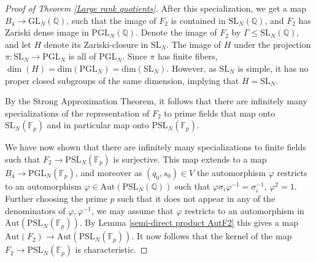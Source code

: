 \documentclass[10pt,a4paper]{amsart}
\begin{document}
\begin{proof}[Proof of Theorem \ref{Large rank quotients}]
After this specialization, we get a map $B_4 \to \mathrm{GL}_N(\mathbb{Q})$, such that the image of $F_2$ is contained in $\mathrm{SL}_N(\mathbb{Q})$, and $F_2$ has Zariski dense image in $\mathrm{PGL}_N(\mathbb{Q})$. Denote the image of $F_2$ by $\Gamma \leq \mathrm{SL}_N(\mathbb{Q}),$ and let $H$ denote its Zariski-closure in $\mathrm{SL}_N.$ The image of $H$ under the projection $\pi:\mathrm{SL}_N \to \mathrm{PGL}_N$ is all of $\mathrm{PGL}_N$. Since $\pi$ has finite fibers, $\dim(H)=\mathrm{dim}(\mathrm{PGL}_N)=\mathrm{dim}(\mathrm{SL}_N)$. However, as $\mathrm{SL}_N$ is simple, it has no proper closed subgroups of the same dimension, implying that $H = \mathrm{SL}_N$.

By the Strong Approximation Theorem, it follows that there are infinitely many specializations of the representation of $F_2$ to prime fields that map onto $\mathrm{SL}_N(\mathbb{F}_p)$ and in particular map onto $\mathrm{PSL}_N(\mathbb{F}_p).$

We have now shown that there are infinitely many specializations to finite fields such that $F_2 \to \mathrm{PSL}_N(\mathbb{F}_p)$ is surjective. This map extends to a map $B_4 \to \mathrm{PGL}_N(\mathbb{F}_p)$, and moreover as $(q_0, s_0) \in V$ the automorphism $\varphi$ restricts to an automorphism $\varphi \in \mathrm{Aut}(\mathrm{PSL}_N(\mathbb{Q}))$ such that $\varphi\sigma_i\varphi^{-1} = \sigma_i^{-1}$, $\varphi^2 = 1$. Further choosing the prime $p$ such that it does not appear in any of the denominators of $\varphi, \varphi^{-1}$, we may assume that $\varphi$ restricts to an automorphism in $\mathrm{Aut}(\mathrm{PSL}_N(\mathbb{F}_p)).$ By Lemma \ref{semi-direct product AutF2} this gives a map $\mathrm{Aut}(F_2) \to \mathrm{Aut}(\mathrm{PSL}_N(\mathbb{F}_p)).$ It now follows that the kernel of the map $F_2 \to \mathrm{PSL}_N(\mathbb{F}_p)$ is characteristic.
\end{proof}
\end{document}
